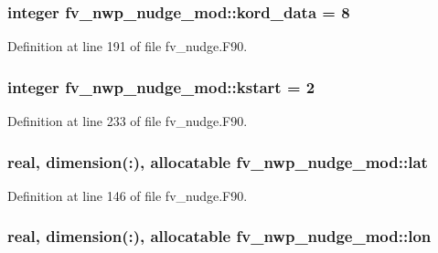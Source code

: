 \subsubsection[{kord\-\_\-data}]{\setlength{\rightskip}{0pt plus 5cm}integer fv\-\_\-nwp\-\_\-nudge\-\_\-mod\-::kord\-\_\-data = 8\hspace{0.3cm}{\ttfamily [private]}}\label{classfv__nwp__nudge__mod_a22e044d4dce29168ca4a9a97017a6759}


Definition at line 191 of file fv\-\_\-nudge.\-F90.

\subsubsection[{kstart}]{\setlength{\rightskip}{0pt plus 5cm}integer fv\-\_\-nwp\-\_\-nudge\-\_\-mod\-::kstart = 2\hspace{0.3cm}{\ttfamily [private]}}\label{classfv__nwp__nudge__mod_ab54932d082a922ed0c64ee023b82cb39}


Definition at line 233 of file fv\-\_\-nudge.\-F90.

\subsubsection[{lat}]{\setlength{\rightskip}{0pt plus 5cm}real, dimension(\-:), allocatable fv\-\_\-nwp\-\_\-nudge\-\_\-mod\-::lat\hspace{0.3cm}{\ttfamily [private]}}\label{classfv__nwp__nudge__mod_a0ff5513f7944f3fabb87a8383880a470}


Definition at line 146 of file fv\-\_\-nudge.\-F90.

\subsubsection[{lon}]{\setlength{\rightskip}{0pt plus 5cm}real, dimension(\-:), allocatable fv\-\_\-nwp\-\_\-nudge\-\_\-mod\-::lon\hspace{0.3cm}{\ttfamily [private]}}\label{classfv__nwp__nudge__mod_ab49ca48851ebaafd62ff97f3e6d2af1f}


